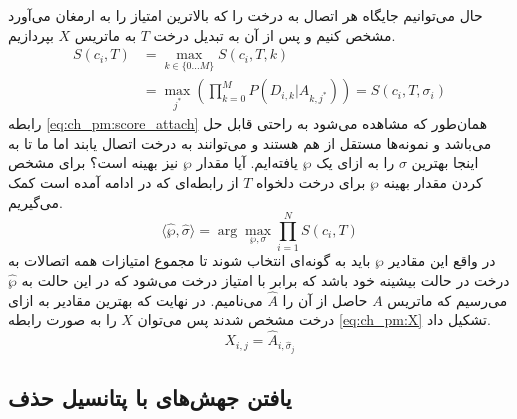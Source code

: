 حال می‌توانیم جایگاه هر اتصال به درخت را که بالاترین امتیاز را به ارمغان می‌آورد مشخص کنیم و پس از آن به تبدیل درخت $T$ به ماتریس $X$ بپردازیم.
\begin{equation}
	\begin{aligned}
		S(c_i, T) &= \max_{k \in \{0 \dots M\}} S(c_i, T, k) \\
		&= \max_{j^*} \left( \prod_{k=0}^{M}P(D_{i,k}|A_{k,j^*})\right) = S(c_i, T, \sigma_i)
	\end{aligned}
	\label{eq:ch_pm:score_attach}
\end{equation}
رابطه \ref{eq:ch_pm:score_attach} همان‌طور که مشاهده می‌شود به راحتی قابل حل می‌باشد و نمونه‌ها مستقل از هم هستند و می‌توانند به درخت اتصال یابند اما ما تا به اینجا بهترین $\sigma$ را به ازای یک $\wp$ یافته‌ایم. آیا مقدار $\wp$ نیز بهینه است؟
برای مشخص کردن مقدار بهینه $\wp$ برای درخت دلخواه $T$ از رابطه‌ای که در ادامه آمده است کمک می‌گیریم.
\begin{equation}
	\langle\hat{\wp}, \hat{\sigma}\rangle = \arg \max_{\wp, \sigma} \prod_{i=1}^{N}S(c_i, T)
	\label{eq:ch_pm:T_score}
\end{equation}
در واقع این مقادیر $\wp$ باید به گونه‌ای انتخاب شوند تا مجموع امتیازات همه اتصالات به درخت در حالت بیشینه خود باشد که برابر با امتیاز درخت می‌شود که در این حالت به $\hat{\wp}$ می‌رسیم که ماتریس $A$ حاصل از آن را $\hat{A}$ می‌نامیم. در نهایت که بهترین مقادیر به ازای درخت مشخص شدند پس می‌توان $X$ را به صورت رابطه \ref{eq:ch_pm:X} تشکیل داد.
\begin{equation}
	X_{i,j} = \hat{A}_{i, \hat{\sigma}_{j}}
	\label{eq:ch_pm:X}
\end{equation}



\subsection{یافتن جهش‌های با پتانسیل حذف}
\label{sec:ch_pm:L}

